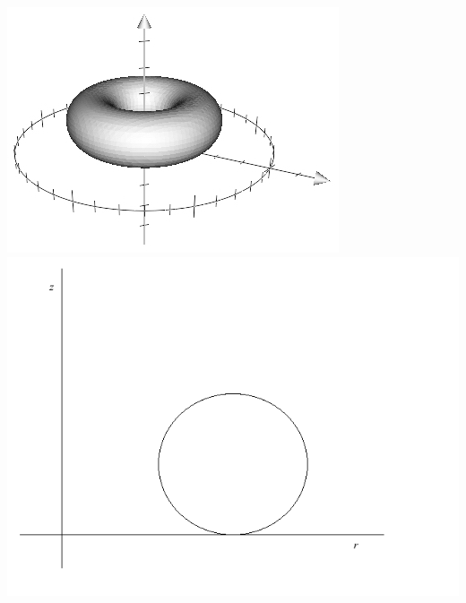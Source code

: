 \documentclass[11pt, oneside]{article}   	%
\begin{document}
\includegraphics[scale=0.5]{torus}
\includegraphics[scale=0.35]{circle}
\end{document}

